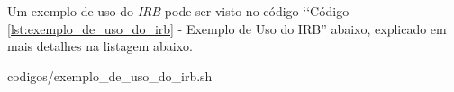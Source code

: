 Um exemplo de uso do \emph{IRB} pode ser visto 
no código ‘‘Código \ref{lst:exemplo_de_uso_do_irb} - Exemplo de Uso do IRB''
abaixo, explicado em mais detalhes na listagem abaixo. 

{codigos/exemplo_de_uso_do_irb.sh}

